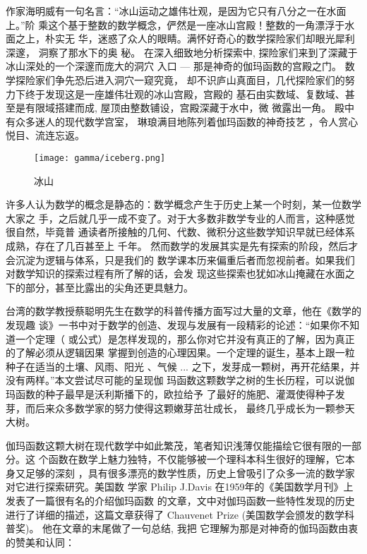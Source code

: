 {作家海明威有一句名言：“冰山运动之雄伟壮观，是因为它只有八分之一在水面上。”阶
乘这个基于整数的数学概念，俨然是一座冰山宫殿！整数的一角漂浮于水面之上，朴实无
华，迷惑了众人的眼睛。满怀好奇心的数学探险家们却眼光犀利深邃， 洞察了那水下的奥
秘。 在深入细致地分析探索中, 探险家们来到了深藏于冰山深处的一个深邃而庞大的洞穴
入口 --- 那是神奇的伽玛函数的宫殿之门。 数学探险家们争先恐后进入洞穴一窥究竟，
却不识庐山真面目，几代探险家们的努力下终于发现这是一座雄伟壮观的冰山宫殿，宫殿的
基石由实数域、复数域、甚至是有限域搭建而成, 屋顶由整数铺设，宫殿深藏于水中，微
微露出一角。 殿中有众多迷人的现代数学宫室， 琳琅满目地陈列着伽玛函数的神奇技艺
，令人赏心悦目、流连忘返。 

\begin{figure}[t]
\centering
\texttt{[image: gamma/iceberg.png]}
\caption{冰山}
\end{figure}

许多人认为数学的概念是静态的：数学概念产生于历史上某一个时刻，某一位数学大家之
手，之后就几乎一成不变了。对于大多数非数学专业的人而言，这种感觉很自然，毕竟普
通读者所接触的几何、代数、微积分这些数学知识早就已经体系成熟，存在了几百甚至上
千年。 然而数学的发展其实是先有探索的阶段，然后才会沉淀为逻辑与体系，只是我们的
数学课本历来偏重后者而忽视前者。如果我们对数学知识的探索过程有所了解的话，会发
现这些探索也犹如冰山掩藏在水面之下的部分，甚至比露出的尖角还更具魅力。 

台湾的数学教授蔡聪明先生在数学的科普传播方面写过大量的文章，他在《数学的发现趣
谈》一书中对于数学的创造、发现与发展有一段精彩的论述：“如果你不知道一个定理（
或公式）是怎样发现的，那么你对它并没有真正的了解，因为真正的了解必须从逻辑因果
掌握到创造的心理因果。一个定理的诞生，基本上跟一粒种子在适当的土壤、风雨、阳光
、气候 ... 之下，发芽成一颗树，再开花结果，并没有两样。”本文尝试尽可能的呈现伽
玛函数这颗数学之树的生长历程，可以说伽玛函数的种子最早是沃利斯播下的，欧拉给予
了最好的施肥、灌溉使得种子发芽，而后来众多数学家的努力使得这颗嫩芽茁壮成长，
最终几乎成长为一颗参天大树。

伽玛函数这颗大树在现代数学中如此繁茂，笔者知识浅薄仅能描绘它很有限的一部分。这
个函数在数学上魅力独特，不仅能够被一个理科本科生很好的理解，它本身又足够的深刻
，具有很多漂亮的数学性质，历史上曾吸引了众多一流的数学家对它进行探索研究。美国数
学家 Philip J.Davis 在1959年的《美国数学月刊》上发表了一篇很有名的介绍伽玛函数
的文章，文中对伽玛函数一些特性发现的历史进行了详细的描述，这篇文章获得了
Chauvenet Prize (美国数学会颁发的数学科普奖)。 他在文章的末尾做了一句总结, 我把
它理解为那是对神奇的伽玛函数由衷的赞美和认同：

}
